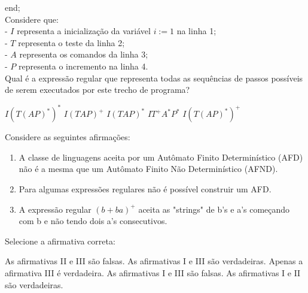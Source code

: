 \documentclass[12pt, addpoints]{exam}
\begin{document}
\begin{questions}
   end;\\



Considere que:\\

- \( I \) representa a inicialização da variável \( i := 1 \) na linha 1;\\

- \( T \) representa o teste da linha 2;\\

- \( A \) representa os comandos da linha 3;\\

- \( P \) representa o incremento na linha 4.\\



Qual é a expressão regular que representa todas as sequências de passos possíveis de serem executados por este trecho de programa?
\begin{choices}
\choice \( I(T(AP)^*)^* \)
\choice \( I(TAP)^+ \)
\choice \( I(TAP)^* \)
\choice \( IT^+A^*P^* \)
\choice \( I(T(AP)^*)^+ \)
\end{choices}

\question

Considere as seguintes afirmações:

\begin{enumerate}[label=\Roman*.]

    \item A classe de linguagens aceita por um Autômato Finito Determinístico (AFD) não é a mesma que um Autômato Finito Não Determinístico (AFND).

    \item Para algumas expressões regulares não é possível construir um AFD.

    \item A expressão regular \((b + ba)^+\) aceita as "strings" de b's e a's começando com b e não tendo dois a's consecutivos.

\end{enumerate}

Selecione a afirmativa correta:
\begin{choices}
\choice As afirmativas II e III são falsas.
\choice As afirmativas I e III são verdadeiras.
\choice Apenas a afirmativa III é verdadeira.
\choice As afirmativas I e III são falsas.
\choice As afirmativas I e II são verdadeiras.
\end{choices}

\question


\end{questions}
\end{document}
